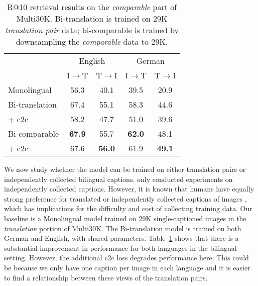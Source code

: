 \begin{table}[t]
\centering
\renewcommand{\arraystretch}{1.3}
\begin{tabular}{lcccc}
\toprule
& \multicolumn{2}{c}{English} &  \multicolumn{2}{c}{German} \\
 & I$\rightarrow$T & T$\rightarrow$I & I$\rightarrow$T & T$\rightarrow$I \\
\midrule
Monolingual			& 56.3 & 40.1 & 39.5 &  20.9\\
\midrule
Bi-translation 			& 67.4 &  55.1 & 58.3 & 44.6 \\
+ c2c     & 58.2 & 47.7 & 51.0 & 39.6\\
\midrule
Bi-comparable        & {\bf 67.9} & 55.7 & {\bf 62.0} & 48.1\\
+ c2c  & 67.6 & {\bf 56.0} & 61.9 & {\bf 49.1} \\
\bottomrule
\end{tabular}
\label{tab:bilingual}
\caption{R@10 retrieval results on the \emph{comparable} part of Multi30K. Bi-translation is trained on 29K \emph{translation pair} data; bi-comparable is trained by downsampling the \emph{comparable} data to 29K.
}
\label{tab:bitrans}
\end{table}
We now study whether the model can be trained on either translation pairs or independently collected bilingual captions. \cite{gella2017image} only conducted experiments on independently collected captions. However, it is known that humans have equally strong preference for translated or independently collected captions of images \citep{frank_elliott_specia_2018}, which has implications for the difficulty and cost of collecting training data. Our baseline is a Monolingual model trained on 29K single-captioned images in the {\it translation} portion of Multi30K. The Bi-translation model is trained on both German and English, with shared parameters. Table~\ref{tab:bitrans} shows that there is a substantial improvement in performance for both languages in the bilingual setting. However, the additional c2c loss degrades performance here. This could be because we only have one caption per image in each language and it is easier to find a relationship between these views of the translation pairs.

